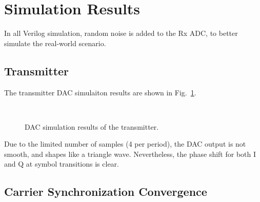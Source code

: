 \documentclass[journal,twoside]{IEEEtran}
\begin{document}
  \section{Simulation Results}

    In all Verilog simulation,
    random noise is added to the Rx ADC, to better simulate the real-world scenario.

    \subsection{Transmitter}

      The transmitter DAC simulaiton results are shown in Fig.~\ref{fig:tx_dac_sim}.
      \begin{figure}[htbp]
        \setlength{\tabcolsep}{2pt}
        \\
        \caption{DAC simulation results of the transmitter.}
        \label{fig:tx_dac_sim}
      \end{figure}

      Due to the limited number of samples (4 per period), the DAC output is not smooth, and shapes like a triangle wave.
      Nevertheless, the phase shift for both I and Q at symbol transitions is clear.

    \subsection{Carrier Synchronization Convergence}\label{subsec:costas_convergence}
\end{document}
